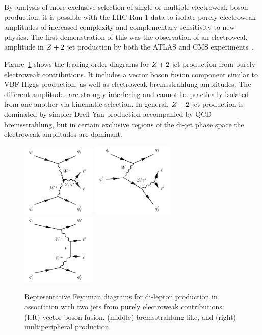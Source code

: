 By analysis of more exclusive selection of single or multiple electroweak boson production,
it is possible with the LHC Run 1 data to isolate purely electroweak amplitudes of
increased complexity and complementary sensitivity to new physics.  The first demonstration of
this was the observation of an electroweak amplitude in $Z+2$ jet production by both the
ATLAS and CMS experiments~\cite{Aad:2014dta, Khachatryan:2014dea}.

Figure~\ref{fig:ss-exclboson-z2j-sigdiagram} shows the leading order diagrams for $Z+2$ jet production
from purely electroweak contributions.  It includes a vector boson fusion component similar to
VBF Higgs production, as well as electroweak bremsstrahlung amplitudes.  The different amplitudes
are strongly interfering and cannot be practically isolated from one another via kinematic selection.
In general, $Z+2$ jet production is dominated by simpler Drell-Yan production accompanied by QCD bremsstrahlung,
but in certain exclusive regions of the di-jet phase space the electroweak amplitudes are dominant.

\begin{figure}[htb] {
\centering
\includegraphics[width=0.315\textwidth]{figures/ss-exclboson-z2j-vbfz_diagram.pdf}
\includegraphics[width=0.35\textwidth]{figures/ss-exclboson-z2j-bckg3_diagram.pdf}
\includegraphics[width=0.315\textwidth]{figures/ss-exclboson-z2j-bckg1_diagram.pdf}
\caption{
Representative Feynman diagrams for di-lepton production in association
with two jets from purely electroweak contributions:
(left) vector boson fusion,
(middle) bremsstrahlung-like,
and (right) multiperipheral production.
\label{fig:ss-exclboson-z2j-sigdiagram}}

}
\end{figure}


